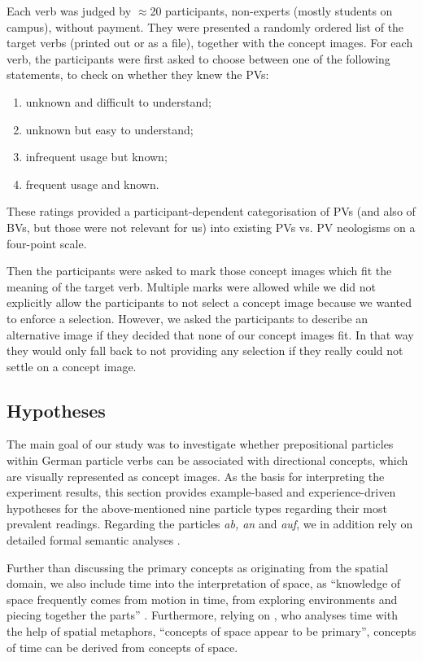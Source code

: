 \documentclass[output=paper]{langsci/langscibook}
\begin{document}
Each verb was judged by $\approx$20 participants, non-experts (mostly
students on campus), without payment. They were presented a randomly
ordered list of the target verbs (printed out or as a file), together
with the concept images. For each verb, the participants were first
asked to choose between one of the following statements, to check on
whether they knew the PVs:
\begin{enumerate}
  \itemsep -1mm
\item unknown and difficult to understand;
\item unknown but easy to understand;
\item infrequent usage but known;
\item frequent usage and known.
\end{enumerate}
These ratings provided a participant-dependent categorisation of PVs
(and also of BVs, but those were not relevant for us) into existing
PVs vs. PV neologisms on a four-point scale.

Then the participants were asked to mark those concept images which
fit the meaning of the target verb. Multiple marks were allowed
while we did not explicitly allow the participants to not select a
concept image because we wanted to enforce a selection. However, we
asked the participants to describe an alternative image if they
decided that none of our concept images fit. In that way they would
only fall back to not providing any selection if they really could not
settle on a concept image.


\subsection{Hypotheses}

The main goal of our study was to investigate whether prepositional
particles within German particle verbs can be associated with
directional concepts, which are visually represented as concept
images. As the basis for interpreting the experiment results, this
section provides example-based and experience-driven hypotheses for
the above-mentioned nine particle types regarding their most prevalent
readings. Regarding the particles \textit{ab, an} and \textit{auf}, we
in addition rely on detailed formal semantic analyses
\citep{Lechler/Rossdeutscher:09ALTER, Kliche:11ALTER,Springorum:11ALTER}.

Further than discussing the primary concepts as originating from the
spatial domain, we also include time into the interpretation of space,
as ``knowledge of space frequently comes from motion in time, from
exploring environments and piecing together the parts''
\citep{Tversky:11}. Furthermore, relying on \cite{Boroditsky:01}, who
analyses time with the help of spatial metaphors, ``concepts of space
appear to be primary'', concepts of time can be derived from concepts
of space.
\end{document}
